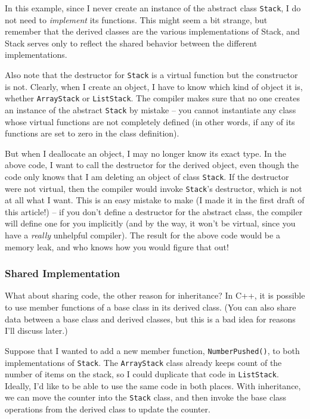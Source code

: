 In this example, since I never create an instance of the
abstract class {\tt Stack}, I do not need to {\em implement} its
functions.  This might seem a bit strange, but remember that
the derived classes are the various implementations of Stack,
and Stack serves only to reflect the shared behavior between
the different implementations.  

Also note that the destructor for {\tt Stack} is a virtual 
function but the constructor is not.  Clearly, when I create an
object, I have to know which kind of object it is, whether 
{\tt ArrayStack} or {\tt ListStack}.  The compiler 
makes sure that no one creates an instance of the abstract {\tt Stack} 
by mistake -- you cannot instantiate any class whose virtual 
functions are not completely defined (in other words, if any of 
its functions are set to zero in the class definition).

But when I deallocate an object, I may no longer know its exact
type.  In the above code, I want to call the destructor for the
derived object, even though the code only knows that I am deleting
an object of class {\tt Stack}.  If the destructor were not virtual,
then the compiler would invoke {\tt Stack}'s destructor, which is 
not at all what I want.  This is an easy mistake to make (I made
it in the first draft of this article!) -- if you don't define
a destructor for the abstract class, the compiler will define one 
for you implicitly (and by the way, it won't be virtual, since you
have a {\em really} unhelpful compiler).  The result for the
above code would be a memory leak, and who knows how you would 
figure that out!

\subsubsection{Shared Implementation}

What about sharing code, the other reason for inheritance? 
In C++, it is possible to use member functions
of a base class in its derived class.  (You can also share
data between a base class and derived classes, but this
is a bad idea for reasons I'll discuss later.)

Suppose that I wanted to add a new member function,
{\tt NumberPushed()}, to both implementations of {\tt Stack}.
The {\tt ArrayStack} class already keeps count of the number of
items on the stack, so I could duplicate that code in {\tt ListStack}.
Ideally, I'd like to be able to use the same code in both places.
With inheritance, we can move the counter into the 
{\tt Stack} class, and then invoke the base class operations
from the derived class to update the counter.

